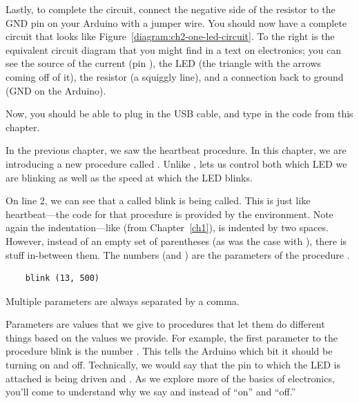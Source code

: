 Lastly, to complete the circuit, connect the negative side of the resistor to the {\code GND} pin on your Arduino with a jumper wire. You should now have a complete circuit that looks like Figure~\vref{diagram:ch2-one-led-circuit}. To the right is the equivalent circuit diagram that you might find in a text on electronics; you can see the source of the current (pin \chtwopin), the LED (the triangle with the arrows coming off of it), the resistor (a squiggly line),  and a connection back to ground (GND on the Arduino).


Now, you should be able to plug in the USB cable, and type in the code from this chapter. %

\newpage

\CODE



\PATTERNS
In the previous chapter, we saw the {\procname heartbeat} procedure. In this chapter, we are introducing a new procedure called \blink. Unlike \heartbeat, \blink lets us control both which LED we are blinking as well as the speed at which the LED blinks.

On line 2, we can see that a \PROCedure called {\procname blink} is being called. This is just like {\procname heartbeat}---the code for that procedure is provided by the \plumbing environment. Note again the indentation---like \heartbeat (from Chapter~\ref{ch1}), \blink is indented by two spaces. However, instead of an empty set of parentheses (as was the case with \heartbeat), there is stuff in-between them. The numbers (\chtwopin and {}) are the {\strong parameters} of the procedure \blink.

\begin{verbatim}
	blink (13, 500)
\end{verbatim}

{\strong Multiple parameters are always separated by a comma}.

Parameters are values that we give to procedures that let them do different things based on the values we provide. For example, the first parameter to the procedure {\procname blink} is the number {}. This tells the Arduino which bit it should be turning on and off. Technically, we would say that the pin to which the LED is attached is being driven \HIGH and \LOW. As we explore more of the basics of electronics, you'll come to understand why we say \HIGH and \LOW instead of ``on'' and ``off.''


